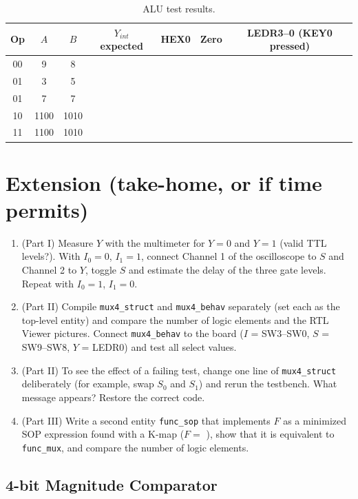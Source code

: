 \documentclass{article}
\begin{document}
\begin{table}[H]
    \centering
    \begin{tabular}{|c|c|c|c|c|c|c|}
        \hline
        Op & $A$ & $B$ & $Y_{int}$ expected & HEX0 & Zero & LEDR3--0 (KEY0 pressed) \\
        \hline
        00 & 9 & 8 & & & & \\ \hline
        01 & 3 & 5 & & & & \\ \hline
        01 & 7 & 7 & & & & \\ \hline
        10 & 1100 & 1010 & & & & \\ \hline
        11 & 1100 & 1010 & & & & \\ \hline
    \end{tabular}
    \caption{ALU test results.}
    \label{tab:alu_test}
\end{table}

\section*{Extension (take-home, or if time permits)}
\begin{enumerate}
    \item (Part I) Measure $Y$ with the multimeter for $Y=0$ and $Y=1$ (valid TTL levels?). With $I_0=0$, $I_1=1$, connect Channel 1 of the oscilloscope to $S$ and Channel 2 to $Y$, toggle $S$ and estimate the delay of the three gate levels. Repeat with $I_0=1$, $I_1=0$.
    \item (Part II) Compile \texttt{mux4\_struct} and \texttt{mux4\_behav} separately (set each as the top-level entity) and compare the number of logic elements and the RTL Viewer pictures. Connect \texttt{mux4\_behav} to the board ($I$ = SW3--SW0, $S$ = SW9--SW8, $Y$ = LEDR0) and test all select values.
    \item (Part II) To see the effect of a failing test, change one line of \texttt{mux4\_struct} deliberately (for example, swap $S_0$ and $S_1$) and rerun the testbench. What message appears? Restore the correct code.
    \item (Part III) Write a second entity \texttt{func\_sop} that implements $F$ as a minimized SOP expression found with a K-map ($F = $ \underline{\hspace{4cm}}), show that it is equivalent to \texttt{func\_mux}, and compare the number of logic elements.
\end{enumerate}

\subsection*{4-bit Magnitude Comparator}
\end{document}
